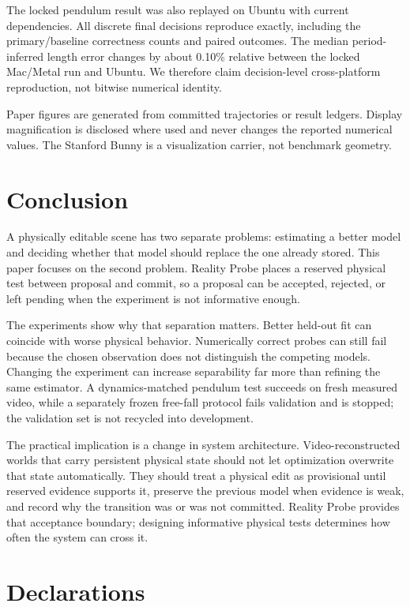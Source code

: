 \documentclass[acmtog]{acmart}
\begin{document}
The locked pendulum result was also replayed on Ubuntu with current dependencies. All discrete final decisions reproduce exactly, including the primary/baseline correctness counts and paired outcomes. The median period-inferred length error changes by about 0.10\% relative between the locked Mac/Metal run and Ubuntu. We therefore claim decision-level cross-platform reproduction, not bitwise numerical identity.

Paper figures are generated from committed trajectories or result ledgers. Display magnification is disclosed where used and never changes the reported numerical values. The Stanford Bunny is a visualization carrier, not benchmark geometry.

\section{Conclusion}\label{conclusion}

A physically editable scene has two separate problems: estimating a better model and deciding whether that model should replace the one already stored. This paper focuses on the second problem. Reality Probe places a reserved physical test between proposal and commit, so a proposal can be accepted, rejected, or left pending when the experiment is not informative enough.

The experiments show why that separation matters. Better held-out fit can coincide with worse physical behavior. Numerically correct probes can still fail because the chosen observation does not distinguish the competing models. Changing the experiment can increase separability far more than refining the same estimator. A dynamics-matched pendulum test succeeds on fresh measured video, while a separately frozen free-fall protocol fails validation and is stopped; the validation set is not recycled into development.

The practical implication is a change in system architecture. Video-reconstructed worlds that carry persistent physical state should not let optimization overwrite that state automatically. They should treat a physical edit as provisional until reserved evidence supports it, preserve the previous model when evidence is weak, and record why the transition was or was not committed. Reality Probe provides that acceptance boundary; designing informative physical tests determines how often the system can cross it.

\section*{Declarations}
\end{document}

